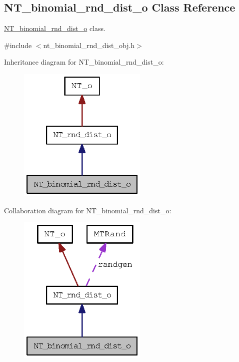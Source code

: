 \subsection{NT\_\-binomial\_\-rnd\_\-dist\_\-o Class Reference}
\label{class_n_t__binomial__rnd__dist__o}


\hyperlink{class_n_t__binomial__rnd__dist__o}{NT\_\-binomial\_\-rnd\_\-dist\_\-o} class.  




{\ttfamily \#include $<$nt\_\-binomial\_\-rnd\_\-dist\_\-obj.h$>$}



Inheritance diagram for NT\_\-binomial\_\-rnd\_\-dist\_\-o:
\nopagebreak
\begin{figure}[H]
\begin{center}
\leavevmode
\includegraphics[width=174pt]{class_n_t__binomial__rnd__dist__o__inherit__graph}
\end{center}
\end{figure}


Collaboration diagram for NT\_\-binomial\_\-rnd\_\-dist\_\-o:
\nopagebreak
\begin{figure}[H]
\begin{center}
\leavevmode
\includegraphics[width=174pt]{class_n_t__binomial__rnd__dist__o__coll__graph}
\end{center}
\end{figure}

